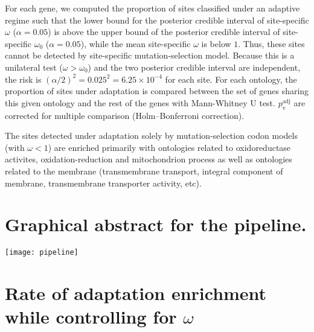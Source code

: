\documentclass{article}
\renewcommand*{\bm}[1]{#1}%
\begin{document}
    For each gene, we computed the proportion of sites classified under an adaptive regime such that the lower bound for the posterior credible interval of site-specific $\omega$ ($\alpha=0.05$) is above the upper bound of the posterior credible interval of site-specific $\omega_{0}$ ($\alpha=0.05$), while the mean site-specific $\omega$ is below $1$.
    Thus, these sites cannot be detected by site-specific mutation-selection model.
    Because this is a unilateral test ($\omega > \omega_{0}$) and the two posterior credible interval are independent, the risk is $(\alpha/2)^2=0.025^2=6.25 \times 10^{-4}$ for each site.
    For each ontology, the proportion of sites under adaptation is compared between the set of genes sharing this given ontology and the rest of the genes with Mann-Whitney U test.
    $p_{\mathrm{v}}^{\mathrm{adj}}$ are corrected for multiple comparison (Holm–Bonferroni correction).

    \begin{center}
        \footnotesize
        
    \end{center}

    The sites detected under adaptation solely by mutation-selection codon models (with $\omega < 1$) are enriched primarily with ontologies related to oxidoreductase activites, oxidation-reduction and mitochondrion process as well as ontologies related to the membrane (transmembrane transport, integral component of membrane, transmembrane transporter activity, etc).

    \pagebreak


    \section{Graphical abstract for the pipeline.}
    \label{subsec:method-summary}

    \begin{center}
        \texttt{[image: pipeline]}
    \end{center}

    \pagebreak


    \section{Rate of adaptation enrichment while controlling for $\bm{\omega}$}
    \label{sec:controlling-for-omega}
\end{document}
